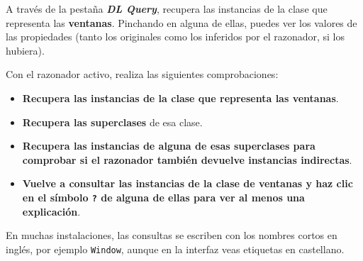 \documentclass[
  spanish,
  11pt,
  a4paper,
  DIV=11,
  numbers=noendperiod]{scrartcl}
\providecommand{\tightlist}{\setlength{\itemsep}{0pt}\setlength{\parskip}{0pt}}
\begin{document}
A través de la pestaña \textbf{\emph{DL Query}}, recupera las instancias
de la clase que representa las \textbf{ventanas}. Pinchando en alguna de
ellas, puedes ver los valores de las propiedades (tanto los originales
como los inferidos por el razonador, si los hubiera).

Con el razonador activo, realiza las siguientes comprobaciones:

\begin{itemize}
\tightlist
\item
  \textbf{Recupera las instancias de la clase que representa las
  ventanas}.
\item
  \textbf{Recupera las superclases} de esa clase.
\item
  \textbf{Recupera las instancias de alguna de esas superclases para
  comprobar si el razonador también devuelve instancias indirectas}.
\item
  \textbf{Vuelve a consultar las instancias de la clase de ventanas y
  haz clic en el símbolo \texttt{?} de alguna de ellas para ver al menos
  una explicación}.
\end{itemize}

\begin{tcolorbox}[enhanced jigsaw, leftrule=.75mm, breakable, colback=white, colbacktitle=quarto-callout-note-color!10!white, bottomrule=.15mm, left=2mm, bottomtitle=1mm, coltitle=black, toprule=.15mm, toptitle=1mm, rightrule=.15mm, opacityback=0, title=\textcolor{quarto-callout-note-color}{\faInfo}\hspace{0.5em}{Pista}, arc=.35mm, titlerule=0mm, colframe=quarto-callout-note-color-frame, opacitybacktitle=0.6]

En muchas instalaciones, las consultas se escriben con los nombres
cortos en inglés, por ejemplo \texttt{Window}, aunque en la interfaz
veas etiquetas en castellano.

\end{tcolorbox}
\end{document}
